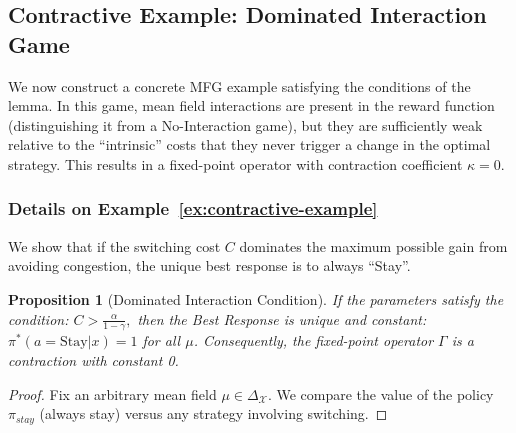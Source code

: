 \documentclass[10pt,twocolumn,letterpaper]{article}
\newtheorem{proposition}[theorem]{Proposition}
\theoremstyle{definition}
\theoremstyle{remark}
\newcommand{\states}{\mathcal{X}}
\begin{document}
{\subsection{Contractive Example: Dominated Interaction Game}
\label{sec:contractive-ex-proof}

We now construct a concrete MFG example satisfying the conditions of the lemma. In this game, mean field interactions are present in the reward function (distinguishing it from a No-Interaction game), but they are sufficiently weak relative to the ``intrinsic'' costs that they never trigger a change in the optimal strategy. This results in a fixed-point operator with contraction coefficient $\kappa = 0$.

\subsubsection{Details on Example~\ref{ex:contractive-example}}
\label{sec:contractive-ex-analysis}

We show that if the switching cost $C$ dominates the maximum possible gain from avoiding congestion, the unique best response is to always ``Stay''.

\begin{proposition}[Dominated Interaction Condition]
\label{prop:contractive-ex-property}
    If the parameters satisfy the condition:
    \(
        C > \frac{\alpha}{1-\gamma},
    \)
    then the Best Response is unique and constant: $\pi^*(a=\text{Stay}|x) = 1$ for all $\mu$. Consequently, the fixed-point operator $\Gamma$ is a contraction with constant 0.
\end{proposition}

\begin{proof}
    Fix an arbitrary mean field $\mu \in \Delta_\states$. We compare the value of the policy $\pi_{stay}$ (always stay) versus any strategy involving switching.
    

\end{proof}}
\end{document}
